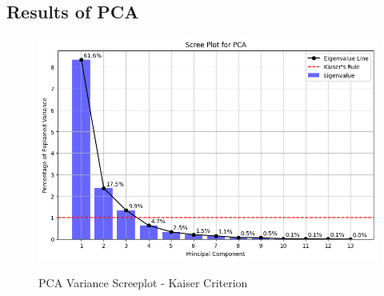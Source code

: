 \documentclass[12pt,a4paper]{article}
\numberwithin{figure}{section}
\numberwithin{table}{section}
\numberwithin{definition}{section}
\begin{document}
\newpage



\subsection{Results of PCA}
\label{ssec:pcaresults}



\begin{figure}[!h]
  \centering
  \caption{PCA Variance Screeplot - Kaiser Criterion}
  \includegraphics[width=\textwidth]{PCA_Variance_Screeplot_kaiser.png}
  \label{fig:pckaiser}
\end{figure}
\end{document}
